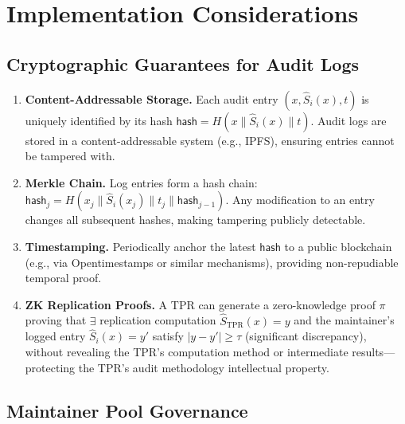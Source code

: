 \documentclass[11pt,a4paper]{article}
\theoremstyle{definition}
\begin{document}
\section{Implementation Considerations}

\subsection{Cryptographic Guarantees for Audit Logs}

\begin{enumerate}[leftmargin=*, label=\textbf{CL\arabic*}]
    \item \textbf{Content-Addressable Storage.} Each audit entry $(x, \hat{S}_i(x), t)$ is uniquely identified by its hash $\textsf{hash} = H(x \| \hat{S}_i(x) \| t)$. Audit logs are stored in a content-addressable system (e.g., IPFS), ensuring entries cannot be tampered with.
    \item \textbf{Merkle Chain.} Log entries form a hash chain: $\textsf{hash}_j = H(x_j \| \hat{S}_i(x_j) \| t_j \| \textsf{hash}_{j-1})$. Any modification to an entry changes all subsequent hashes, making tampering publicly detectable.
    \item \textbf{Timestamping.} Periodically anchor the latest $\textsf{hash}$ to a public blockchain (e.g., via Opentimestamps or similar mechanisms), providing non-repudiable temporal proof.
    \item \textbf{ZK Replication Proofs.} A TPR can generate a zero-knowledge proof $\pi$ proving that $\exists$ replication computation $\hat{S}_{\text{TPR}}(x) = y$ and the maintainer's logged entry $\hat{S}_i(x) = y'$ satisfy $|y - y'| \geq \tau$ (significant discrepancy), without revealing the TPR's computation method or intermediate results---protecting the TPR's audit methodology intellectual property.
\end{enumerate}

\subsection{Maintainer Pool Governance}
\end{document}
